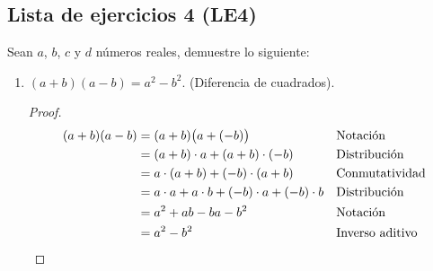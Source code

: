 \documentclass[11pt]{article}
\begin{document}
\subsection*{Lista de ejercicios 4 (LE4)}

Sean $a$, $b$, $c$ y $d$ números reales, demuestre lo siguiente:

\begin{enumerate}[label=\alph*)]
    \item $(a+b)(a-b)=a^2-b^2$. (Diferencia de cuadrados).
\vspace{-1em}\begin{proof} 
    \begin{align*}
    (a+b)(a-b) &= (a+b)\bigl(a+(-b)\bigr) && \text{Notación}\\
    &= (a+b)\cdot a + (a+b)\cdot (-b) && \text{Distribución}\\
    &= a\cdot (a+b) + (-b)\cdot (a+b) && \text{Conmutatividad}\\
    &= a\cdot a + a\cdot b + (-b)\cdot a + (-b) \cdot b && \text{Distribución}\\
    &= a^2+ ab -ba -b^2 && \text{Notación}\\
    &=a^2-b^2 && \text{Inverso aditivo} \qedhere
    \end{align*}    
\end{proof} \vspace{-1em}


\end{enumerate}
\end{document}
